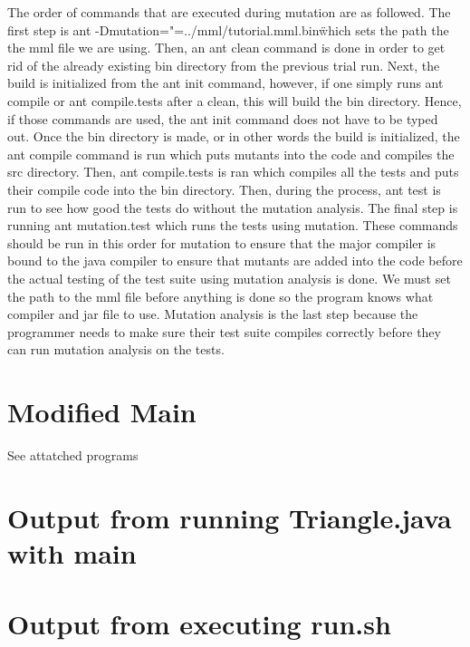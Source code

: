 \documentclass[12pt]{article}
\begin{document}
The order of commands that are executed during mutation are as followed.
The first step is ant -Dmutation="=../mml/tutorial.mml.bin\" which sets the path the the mml file we are using.  Then, an ant clean command is done in order to get rid of the already existing bin directory from the previous trial run. Next, the build is initialized from the ant init command, however, if one simply runs ant compile or ant compile.tests after a clean, this will build the bin directory. Hence, if those commands are used, the ant init command does not have to be typed out. Once the bin directory is made, or in other words the build is initialized, the ant compile command is run which puts mutants into  the code and compiles the src directory. Then,  ant compile.tests is ran which compiles all the tests and puts their compile code into the bin directory. Then, during the process, ant test is run to see how good the tests do without the mutation analysis. The final step is running ant mutation.test which runs the tests using mutation. These commands should be run in this order for mutation to ensure that the major compiler is bound to the java compiler to ensure that mutants are added into the code before the actual testing of the test suite using mutation analysis is done. We must set the path to the mml file before anything is done so the program knows what compiler and jar file to use. Mutation analysis is the last step because the programmer needs to make sure their test suite compiles correctly before they can run mutation analysis on the tests.  
\vspace*{.1in}
\section{Modified Main}
\label{sec:three}
See attatched programs
\vspace*{.1in}
\section{Output from running Triangle.java with main}
\label{sec:four}
\vspace*{-.1in}

\vspace*{.1in}
\section{Output from executing run.sh}
\label{sec:five}
\vspace*{-.1in}
\end{document}
